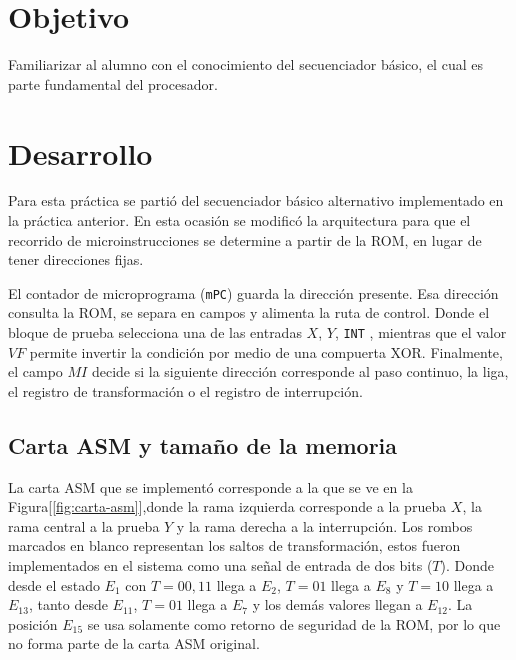 \documentclass[letterpaper,12pt]{article}
\begin{document}

\newpage


\section{Objetivo}

Familiarizar al alumno con el conocimiento del secuenciador básico, el cual es parte fundamental del procesador.

\section{Desarrollo}

Para esta práctica se partió del secuenciador básico alternativo implementado en la práctica anterior. En esta ocasión se modificó la arquitectura para que el recorrido de microinstrucciones se determine a partir de la ROM, en lugar de tener direcciones fijas. 

El contador de microprograma (\texttt{mPC}) guarda la dirección presente. Esa dirección consulta la ROM, se separa en campos y alimenta la ruta de control. Donde el bloque de prueba selecciona una de las entradas $X$, $Y$, \texttt{INT} , mientras que el valor $VF$ permite invertir la condición por medio de una compuerta XOR. Finalmente, el campo $MI$ decide si la siguiente dirección corresponde al paso continuo, la liga, el registro de transformación o el registro de interrupción.

\subsection{Carta ASM y tamaño de la memoria}

La carta ASM que se implementó corresponde a la que se ve en la Figura[\ref{fig:carta-asm}],donde la rama izquierda corresponde a la prueba $X$, la rama central a la prueba $Y$ y la rama derecha a la interrupción. Los rombos marcados en blanco representan los saltos de transformación, estos fueron implementados en el sistema como una señal de entrada de dos bits ($T$). Donde desde el estado $E_1$ con $T=00,11$ llega a $E_2$, $T=01$ llega a $E_8$ y $T=10$ llega a $E_{13}$, tanto desde $E_{11}$, $T=01$ llega a $E_7$ y los demás valores llegan a $E_{12}$. La posición $E_{15}$ se usa solamente como retorno de seguridad de la ROM, por lo que no forma parte de la carta ASM original.
\end{document}
